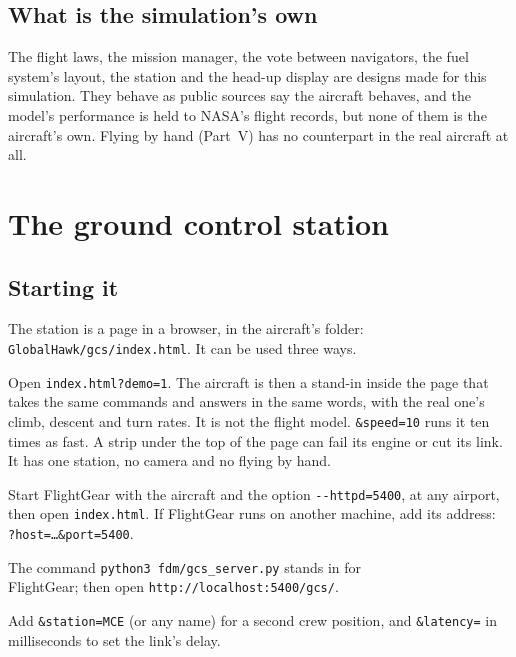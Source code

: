 \documentclass[11pt,a4paper,oneside]{book}
\begin{document}
\section{What is the simulation's own}
The flight laws, the mission manager, the vote between navigators, the fuel system's layout, the station and the
head-up display are designs made for this simulation. They behave as public sources say the aircraft behaves, and the
model's performance is held to NASA's flight records, but none of them is the aircraft's own. Flying by hand
(Part~V) has no counterpart in the real aircraft at all.

\chapter{The ground control station}\label{ch:station}
\section{Starting it}
The station is a page in a browser, in the aircraft's folder: \nolinkurl{GlobalHawk/gcs/index.html}. It can be used three
ways.
\begin{description}[leftmargin=8mm]
\item[The demo.] Open \texttt{index.html?demo=1}. The aircraft is then a stand-in inside the page that takes the same
commands and answers in the same words, with the real one's climb, descent and turn rates. It is not the flight
model. \texttt{\&speed=10} runs it ten times as fast. A strip under the top of the page can fail its engine or cut its
link. It has one station, no camera and no flying by hand.
\item[With FlightGear.] Start FlightGear with the aircraft and the option \texttt{-{}-httpd=5400}, at any airport,
then open \texttt{index.html}. If FlightGear runs on another machine, add its address:\\ \texttt{?host=\ldots\&port=5400}.
\item[With the flight model alone.] The command \texttt{python3 fdm/gcs\_server.py} stands in for\\ FlightGear; then open \nolinkurl{http://localhost:5400/gcs/}.
\end{description}
Add \texttt{\&station=MCE} (or any name) for a second crew position, and \texttt{\&latency=} in milliseconds to set
the link's delay.
\end{document}
